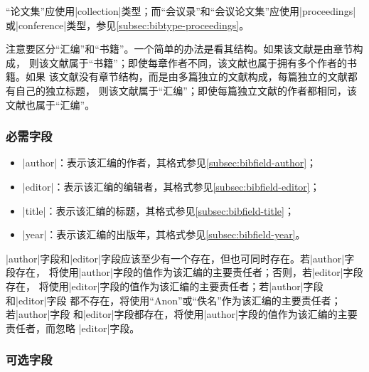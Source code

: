 \begin{note}
“论文集”应使用|collection|类型；而“会议录”和“会议论文集”应使用|proceedings|
或|conference|类型，参见\ref{subsec:bibtype-proceedings}。
\end{note}

\begin{note}
注意要区分“汇编”和“书籍”。一个简单的办法是看其结构。如果该文献是由章节构成，
则该文献属于“书籍”；即使每章作者不同，该文献也属于拥有多个作者的书籍。如果
该文献没有章节结构，而是由多篇独立的文献构成，每篇独立的文献都有自己的独立标题，
则该文献属于“汇编”；即使每篇独立文献的作者都相同，该文献也属于“汇编”。
\end{note}

\subsubsection{必需字段}

\begin{itemize}
\item |author|：表示该汇编的作者，其格式参见\ref{subsec:bibfield-author}；
\item |editor|：表示该汇编的编辑者，其格式参见\ref{subsec:bibfield-editor}；
\item |title|：表示该汇编的标题，其格式参见\ref{subsec:bibfield-title}；
\item |year|：表示该汇编的出版年，其格式参见\ref{subsec:bibfield-year}。
\end{itemize}

\begin{note}
|author|字段和|editor|字段应该至少有一个存在，但也可同时存在。若|author|字段存在，
{\BibTeX}将使用|author|字段的值作为该汇编的主要责任者；否则，若|editor|字段存在，
{\BibTeX}将使用|editor|字段的值作为该汇编的主要责任者；若|author|字段和|editor|字段
都不存在，{\BibTeX}将使用``Anon''或``佚名''作为该汇编的主要责任者；若|author|字段
和|editor|字段都存在，{\BibTeX}将使用|author|字段的值作为该汇编的主要责任者，而忽略
|editor|字段。
\end{note}

\subsubsection{可选字段}

